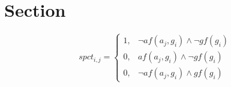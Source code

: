 \documentclass[a4paper]{article}
\begin{document}
\section{Section}

\begin{equation}
spct_{i,j} =
\begin{cases}
1, & \text{$\neg af(a_j,g_i) \wedge \neg gf(g_i)$}\\
0, & \text{$af(a_j,g_i) \wedge \neg gf(g_i)$}\\
0, & \text{$\neg af(a_j,g_i) \wedge gf(g_i)$}
\end{cases}
\end{equation}
\end{document}
